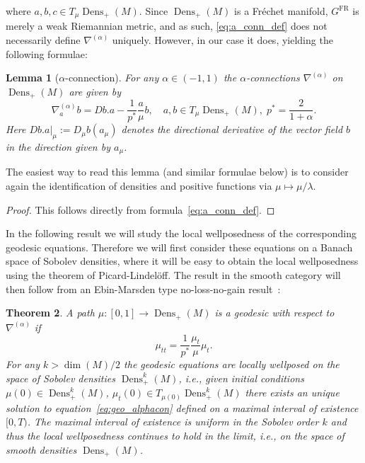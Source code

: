 \documentclass[11pt]{amsart}
\newtheorem{theorem}{Theorem}[section]
\newtheorem{lemma}[theorem]{Lemma}
\theoremstyle{definition}
\newcommand{\dx}{\lambda}
\newcommand{\Prob}{\operatorname{Prob}(M)}
\newcommand{\Dens}{\operatorname{Dens}_+(M)}
\newcommand{\Densk}{\operatorname{Dens}^k_+(M)}
\newcommand{\GFR}{G^{\mathrm{FR}}}
\newcommand{\nablabar}{\overline{\nabla}}
\begin{document}
where $a,b,c\in T_\mu\Dens$.
Since $\Dens$ is a Fr\'echet manifold, $\GFR$ is merely a weak Riemannian metric, and as such, \eqref{eq:a_conn_def} does not necessarily define $\nabla^{(\alpha)}$ uniquely.
However, in our case it does, yielding the following formulae:
\begin{lemma}[$\alpha$-connection]\label{lem:alphacon}
    For any $\alpha\in (-1,1)$ the $\alpha$-connections $\nabla^{(\alpha)}$ on $\Dens$ are given by
    \begin{equation}\label{alpha-dens}
    \nabla^{(\alpha)}_a b = Db.a - \frac{1}{p^*} \frac{a}{\mu}b,\quad a,b\in T_\mu\Dens,\;p^* = \frac{2}{1+\alpha}.
    \end{equation}
    Here $Db.a|_{\mu}:=D_\mu b(a_\mu)$ denotes the directional derivative of the vector field $b$ in the direction given by $a_\mu$. 
\end{lemma}
The easiest way to read this lemma (and similar formulae below) is to consider again the identification of densities and positive functions via $\mu\mapsto \mu/\dx$.
\begin{proof}
This follows directly from formula~\eqref{eq:a_conn_def}.
\end{proof}
In the following result we will study the local wellposedness of the corresponding geodesic equations. Therefore we will first consider these equations on a Banach space of Sobolev densities, where it will be easy to obtain the local wellposedness using the theorem of Picard-Lindel\"off. The result in the smooth category will then follow from an Ebin-Marsden type no-loss-no-gain result~\cite{ebin1970groups}:
\begin{theorem}\label{thm:geo_alpha_dens}
A path $\mu:[0,1]\to \Dens$ is a geodesic with respect to $\nabla^{(\alpha)}$ if
\begin{equation}\label{eq:geo_alphacon}
\mu_{tt} = \frac{1}{p^*}\frac{\mu_t}{\mu}\mu_t.
\end{equation}
For any $k>\operatorname{dim}(M)/2$ the geodesic equations are locally wellposed on the space of Sobolev densities $\Densk$, i.e., given initial conditions $\mu(0)\in \Densk$, $\mu_t(0)\in T_{\mu(0)}\Densk$ there exists an unique solution to equation~\eqref{eq:geo_alphacon} defined on a maximal interval of existence $[0,T)$. 
The maximal interval of existence is uniform in the Sobolev order $k$ and thus the local wellposedness continues to hold in the limit, i.e., on the space of smooth densities $\Dens$.
\end{theorem}
\end{document}
